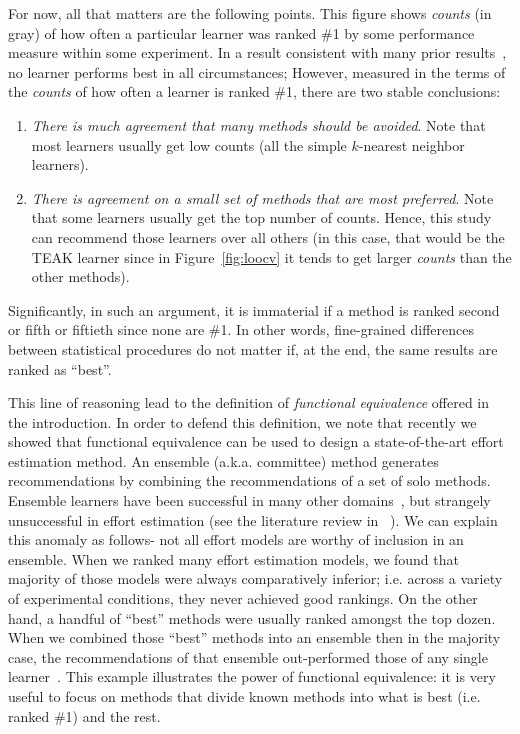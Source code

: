 \documentclass{sig-alternate}
\newcommand{\be}{\begin{enumerate}}
\newcommand{\ee}{\end{enumerate}}
\newcommand{\fig}[1]{Figure~\ref{fig:#1}}
\begin{document}
For now, all that matters
are the following  points.
This figure shows {\em counts} (in gray) of how often a particular learner was ranked \#1 by
some performance measure within some experiment.
In a result consistent with many prior results~\cite{myrtveit05,me11a}, no learner performs best in all circumstances;
However, measured in the terms of the {\em counts} of how often a learner is ranked \#1, there are two stable conclusions:
\be
\item
{\em There is much agreement that many
methods should be avoided}. Note that 
most learners usually get low counts (all the simple $k$-nearest neighbor learners).
\item
{\em There is agreement on a small set of methods that are most preferred}.
Note that
some learners usually get the top number of counts.
Hence, this study can recommend those learners over all others (in this case, that would be the TEAK learner since
in  \fig{loocv} it tends to get larger {\em counts} than the other methods).
\ee
Significantly, 
in such an   argument,
it is immaterial if  a method is ranked second or fifth or fiftieth  since none  are \#1.
In other words, fine-grained differences between statistical procedures 
do not matter if, at the end, the same results are ranked as ``best''. 

This line of reasoning lead to the
definition of {\em functional equivalence} offered
in the introduction.
In order to defend this
definition, we note
that
recently we showed that
functional equivalence can be used to design  a state-of-the-art 
effort
estimation method.
An ensemble (a.k.a. committee) method generates
recommendations by combining the recommendations of a set of solo
methods.  
Ensemble learners have been successful in many other domains~\cite{Seni2010,Hastie08,Kohavi95,breiman92}, but
strangely unsuccessful in effort estimation (see the literature review in ~\cite{me11a}).
We can explain this
anomaly as follows- not all effort models are worthy of inclusion
in an ensemble. When we ranked many effort estimation models, 
we found that
majority of those models were always comparatively inferior;
i.e. across a variety of experimental conditions, they never achieved
good rankings. On the other hand, a handful of ``best'' methods were
usually ranked amongst the top dozen. When  we combined those
``best'' methods into an ensemble then in the majority case, the
recommendations of that ensemble out-performed those of any single
learner~\cite{me11a}. This example illustrates the power of functional
equivalence: 
it is very useful to focus on methods that divide known methods into what is
best  (i.e. ranked \#1) and the rest.
\end{document}
